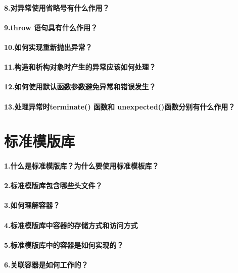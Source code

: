\documentclass[UTF8,a4paper,8pt]{ctexart}
\begin{document}
	 \paragraph{8.对异常使用省略号有什么作用？}
	 \paragraph{9.throw 语句具有什么作用？}
	 \paragraph{10.如何实现重新抛出异常？}
	 \paragraph{11.构造和析构对象时产生的异常应该如何处理？}
	 \paragraph{12.如何使用默认函数参数避免异常和错误发生？}
	 \paragraph{13.处理异常时terminate() 函数和 unexpected()函数分别有什么作用？}

\section*{标准模版库}
	 \paragraph{1.什么是标准模版库？为什么要使用标准模板库？} 
	 \paragraph{2.标准模版库包含哪些头文件？}
	 \paragraph{3.如何理解容器？}
	 \paragraph{4.标准模版库中容器的存储方式和访问方式}
	 \paragraph{5.标准模版库中的容器是如何实现的？}
	 \paragraph{6.关联容器是如何工作的？}
\end{document}
